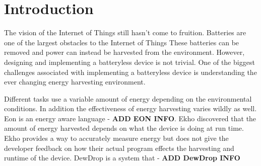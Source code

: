 \section{Introduction} %
\label{sec:introduction}

The vision of the Internet of Things still hasn't come to fruition.
Batteries are one of the largest obstacles to the Internet of Things \cite{intermittentAndAwesome}
These batteries can be removed and power can instead be harvested from the environment.
However, designing and implementing a batteryless device is not trivial.
One of the biggest challenges associated with implementing a batteryless device is understanding the ever changing energy harvesting environment.

Different tasks use a variable amount of energy depending on the environmental conditions.
In addition the effectiveness of energy harvesting varies wildly as well.
Eon \cite{eon} is an energy aware language - \textbf{ADD EON INFO}.
Ekho \cite{ekho} discovered that the amount of energy harvested depends on what the device is doing at run time.
Ekho provides a way to accurately measure energy but does not give the developer feedback on how their actual program effects the harvesting and runtime of the device.
DewDrop \cite{dewdrop} is a system that - \textbf{ADD DewDrop INFO}
